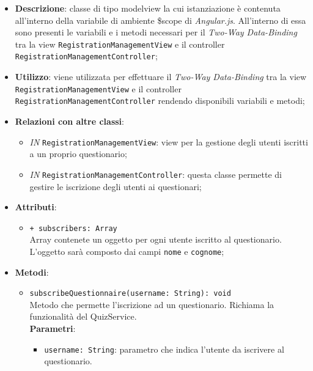 	\begin{itemize}
		\item \textbf{Descrizione}: classe di tipo modelview la cui istanziazione è contenuta all'interno della variabile di ambiente \$scope di \textit{Angular.js}. All'interno di essa sono presenti le variabili e i metodi necessari per il \textit{Two-Way Data-Binding} tra la view \texttt{RegistrationManagementView} e il controller \texttt{RegistrationManagementController};
		\item \textbf{Utilizzo}: viene utilizzata per effettuare il \textit{Two-Way Data-Binding} tra la view \texttt{RegistrationManagementView} e il controller \texttt{RegistrationManagementController} rendendo disponibili variabili e metodi;
		\item \textbf{Relazioni con altre classi}: 
		\begin{itemize}
			\item \textit{IN} \texttt{RegistrationManagementView}: view per la gestione degli utenti iscritti a un proprio questionario; 
			\item \textit{IN} \texttt{RegistrationManagementController}: questa classe permette di gestire le iscrizione degli utenti ai questionari;
		\end{itemize}
		\item \textbf{Attributi}: 
		\begin{itemize}
			\item \texttt{+ subscribers: Array} \\ Array contenete un oggetto per ogni utente iscritto al questionario. L'oggetto sarà composto dai campi \texttt{nome} e \texttt{cognome};
		\end{itemize}
		\item \textbf{Metodi}: 
		\begin{itemize}
			\item \texttt{subscribeQuestionnaire(username: String): void} \\ Metodo che permette l'iscrizione ad un questionario. Richiama la funzionalità del QuizService. \\
			\textbf{Parametri}:
			\begin{itemize}
				\item \texttt{username: String}: parametro che indica l'utente da iscrivere al questionario.
			\end{itemize}
		\end{itemize}
	\end{itemize}
	
